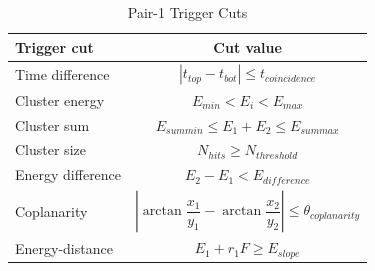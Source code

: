 \begin{table}[htb]
\caption{Pair-1 Trigger Cuts}
\label{tab:pairTriggerCuts}
\centering
\begin{tabular}{lc}
\toprule
Trigger cut & Cut value \\
\midrule
Time difference & $| t_{top}-t_{bot} | \leq t_{coincidence}$   \\
Cluster energy & $E_{min}<E_{i}<E_{max}$\\
Cluster sum & $E_{sum min}\leq E_1+E_2\leq E_{sum max}$\\
Cluster size & $N_{hits}\geq N_{threshold}$\\
Energy difference & $ E_{2}-E_{1}<E_{difference}$\\
Coplanarity & $ |\arctan\dfrac{x_1}{y_1}-\arctan\dfrac{x_2}{y_2} | \leq \theta_{coplanarity}$\\
Energy-distance & $E_{1}+r_{1}F\geq E_{slope}$ \\ 
\bottomrule
\end{tabular}
\end{table}

